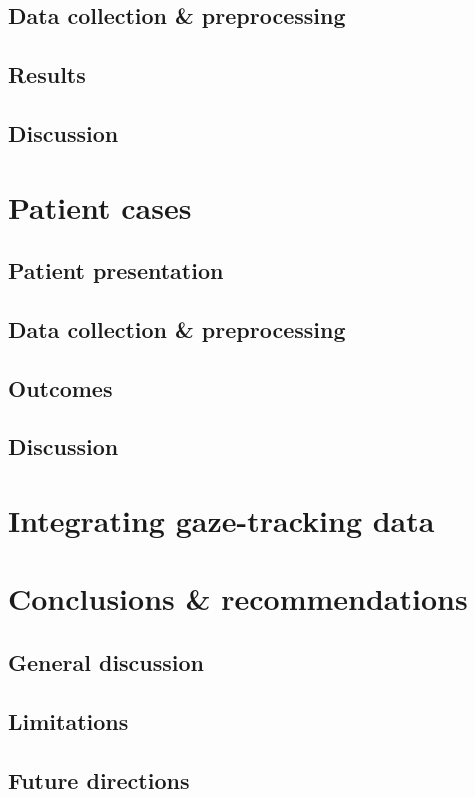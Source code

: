 \section{Data collection \& preprocessing}
\section{Results}
\section{Discussion}

\chapter{Patient cases}
\section{Patient presentation}
\section{Data collection \& preprocessing}
\section{Outcomes}
\section{Discussion}

\chapter{Integrating gaze-tracking data}

\chapter{Conclusions \& recommendations}
\section{General discussion}
\section{Limitations}
\section{Future directions}
